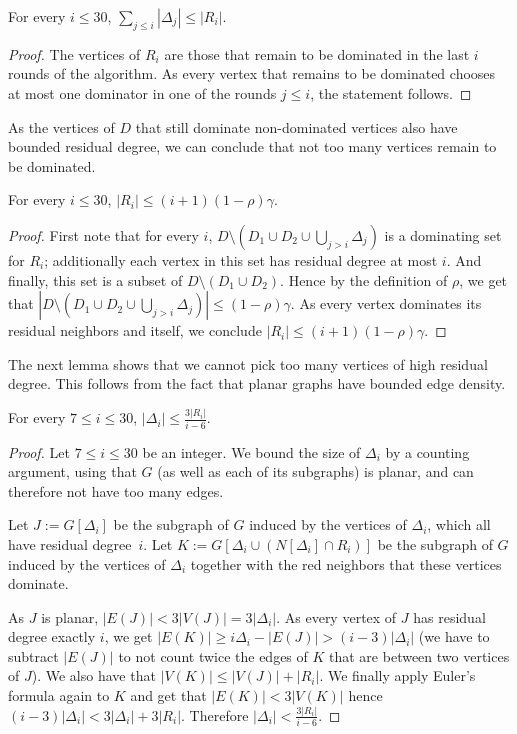 \begin{lemma}\label{lem:total-h}
  For every $i\le 30$, $\sum\limits_{j\le i}|\Delta_j| \le |R_i|$.
\end{lemma}
\begin{proof}
  The vertices of $R_i$ are those that remain to be dominated in the
  last $i$ rounds of the algorithm. As every vertex that remains to be
  dominated chooses at most one dominator in one of the rounds
  $j\leq i$, the statement follows.
\end{proof}

As the vertices of $D$ that still dominate non-dominated vertices also
have bounded residual degree, we can conclude that not too many
vertices remain to be dominated.
\begin{lemma}\label{lem:h1}
  For every $i\le 30$, $|R_i| \le (i+1)(1-\rho)\gamma$.
\end{lemma}
\begin{proof}
  First note that for every $i$,
  $D\setminus (D_1\cup D_2\cup \bigcup_{j>i}\Delta_j)$ is a dominating
  set for $R_i$; additionally each vertex in this set has residual
  degree at most $i$.  And finally, this set is a subset of
  $D\setminus (D_1\cup D_2)$. Hence by the definition of $\rho$, we get
  that
  $|D\setminus (D_1\cup D_2\cup \bigcup_{j>i}\Delta_j)|\le
  (1-\rho)\gamma$. As every vertex dominates its residual neighbors and
  itself, we conclude $|R_i|\le (i+1)(1-\rho)\gamma$.
\end{proof}

The next lemma shows that we cannot pick too many vertices of high
residual degree. This follows from the fact that planar graphs have
bounded edge density.

\begin{lemma}\label{lem:delta}
  For every $7\le i\le 30$, $|\Delta_i| \le \frac{3|R_i|}{i-6}$.
\end{lemma}
\begin{proof}
  Let $7\le i\le 30$ be an integer. We bound the size of $\Delta_i$
  by a counting argument, using that $G$ (as well as each of its
  subgraphs) is planar, and can therefore not have too many edges.

  Let $J := G[\Delta_i]$ be the subgraph of $G$ induced by the
  vertices of $\Delta_i$, which all have residual degree~$i$. Let
  $K := G[\Delta_i \cup (N[\Delta_i]\cap R_i)]$ be the subgraph of $G$
  induced by the vertices of $\Delta_i$ together with the red
  neighbors that these vertices dominate.

  As $J$ is planar, $|E(J)| < 3|V(J)| = 3|\Delta_i|$. As every
  vertex of $J$ has residual degree exactly $i$, we get
  $|E(K)| \geq i\Delta_i - |E(J)| > (i-3)|\Delta_i|$ (we have to
  subtract $|E(J)|$ to not count twice the edges of $K$ that are
  between two vertices of $J$).  We also have that
  $|V(K)| \le |V(J)| + |R_i|$. We finally apply Euler's formula again
  to $K$ and get that $|E(K)| < 3|V(K)|$ hence
  $(i-3)|\Delta_i| < 3|\Delta_i| + 3|R_i|$. Therefore
  $|\Delta_i|< \frac{3|R_i|}{i-6}$.
\end{proof}

